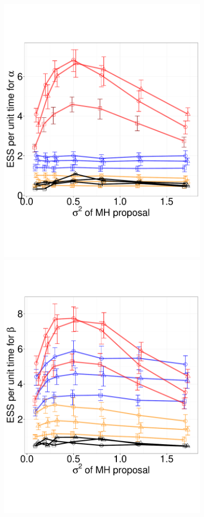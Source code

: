   \begin{figure}[H]
  \centering
  \begin{minipage}[!hp]{0.45\linewidth}
  \centering
    \includegraphics [width=0.90\textwidth, angle=0]{figs/exp_5_alpha.pdf}
      \end{minipage}
  \begin{minipage}[hp]{0.45\linewidth}
  \centering
    \includegraphics [width=0.90\textwidth, angle=0]{figs/exp_5_beta.pdf}

\end{minipage}
\end{figure}
